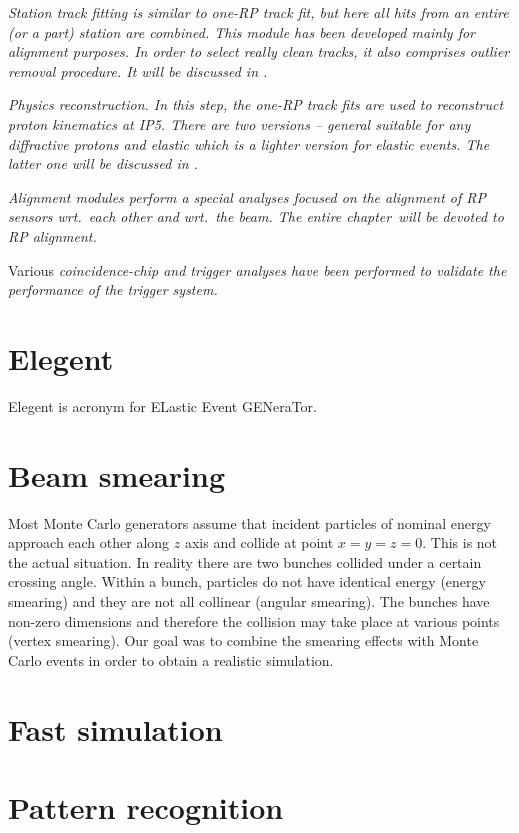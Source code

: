 \em{Station track fitting} is similar to one-RP track fit, but here all hits from an entire (or a part) station are combined. This module has been developed mainly for alignment purposes. In order to select really clean tracks, it also comprises outlier removal procedure. It will be discussed in .

\em{Physics reconstruction}.
In this step, the one-RP track fits are used to reconstruct proton kinematics at IP5. There are two versions -- \em{general} suitable for any diffractive protons and \em{elastic} which is a lighter version for elastic events. The latter one will be discussed in .

\em{Alignment} modules perform a special analyses focused on the alignment of RP sensors wrt.~each other and wrt.~the beam. The entire chapter~will be devoted to RP alignment.

Various \em{coincidence-chip and trigger analyses} have been performed to validate the performance of the trigger system.

\section[elegent]{Elegent}

Elegent is acronym for ELastic Event GENeraTor.

\section[beam smearing]{Beam smearing}

Most Monte Carlo generators assume that incident particles of nominal energy approach each other along $z$ axis and collide at point $x = y = z = 0$. This is not the actual situation. In reality there are two bunches collided under a certain crossing angle. Within a bunch, particles do not have identical energy (energy smearing) and they are not all collinear (angular smearing). The bunches have non-zero dimensions and therefore the collision may take place at various points (vertex smearing). Our goal was to combine the smearing effects with Monte Carlo events in order to obtain a realistic simulation.



\section[fast simu]{Fast simulation}

\section[pattern reco]{Pattern recognition}

